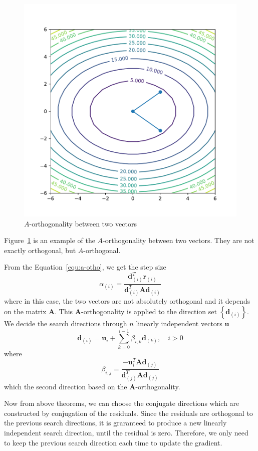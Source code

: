 \begin{figure}[t]
    \label{fig:a-ortho}
    \centering
    \includegraphics[page=1, width=.6\textwidth]{figs/a-orthogonal-example.pdf}
    \caption{$A$-orthogonality between two vectors}
\end{figure}
\par Figure~\ref{fig:a-ortho} is an example of the $A$-orthogonality between two vectors. They are not exactly orthogonal, but $A$-orthogonal. 
\par From the Equation~\ref{equ:a-otho}, we get the step size
\begin{equation}
    \label{equ:ini-stepsize}
    \alpha_{(i)}=\frac{\mathbf{d}_{(i)}^{T} \mathbf{r}_{(i)}}{\mathbf{d}_{(i)}^{T} \mathbf{A} \mathbf{d}_{(i)}}
\end{equation}
where in this case, the two vectors are not absolutely orthogonal and it depends on the matrix $\mathbf{A}$. This $\mathbf{A}$-orthogonality is applied to the direction set $\left\{\mathbf{d}_{(i)}\right\}$. We decide the search directions through $n$ linearly independent vectors $\mathbf{u}$
\begin{equation}
    \mathbf{d}_{(i)}=\mathbf{u}_{i}+\sum_{k=0}^{i-1} \beta_{i, k} \mathbf{d}_{(k)}, \quad i>0
\end{equation}
where 
\begin{equation}
    \label{equ:update-beta}
    \beta_{i, j}=\frac{-\mathbf{u}_{i}^{T} \mathbf{A} \mathbf{d}_{(j)}}{\mathbf{d}_{(j)}^{T} \mathbf{A} \mathbf{d}_{(j)}}
\end{equation}
which the second direction based on the $\mathbf{A}$-orthogonality. 
\par Now from above theorems, we can choose the conjugate directions which are constructed by conjugation of the residuals. Since the residuals are orthogonal to the previous search directions, it is graranteed to produce a new linearly independent search direction, until the residual is zero. Therefore, we only need to keep the previous search direction each time to update the gradient. 

